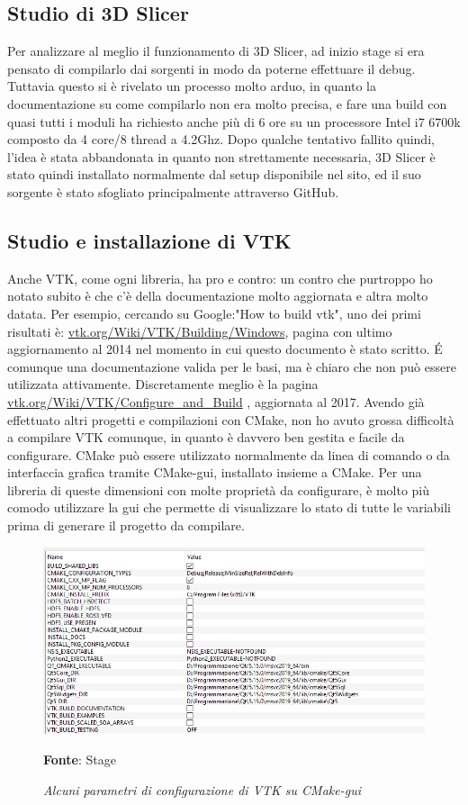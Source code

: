 \subsection{Studio di 3D Slicer}
Per analizzare al meglio il funzionamento di 3D Slicer, ad inizio stage si era pensato di compilarlo dai sorgenti in modo da poterne effettuare il debug. Tuttavia questo si è rivelato un processo molto arduo, in quanto la documentazione su come compilarlo non era molto precisa, e fare una build con quasi tutti i moduli ha richiesto anche più di 6 ore su un processore Intel i7 6700k composto da 4 core/8 thread a 4.2Ghz. Dopo qualche tentativo fallito quindi, l'idea è stata abbandonata in quanto non strettamente necessaria, 3D Slicer è stato quindi installato normalmente dal setup disponibile nel sito, ed il suo sorgente è stato sfogliato principalmente attraverso GitHub.

\subsection{Studio e installazione di VTK}
Anche VTK, come ogni libreria, ha pro e contro: un contro che purtroppo ho notato subito è che c'è della documentazione molto aggiornata e altra molto datata. Per esempio, cercando su Google:"How to build vtk", uno dei primi risultati è: \href{https://vtk.org/Wiki/VTK/Building/Windows}{vtk.org/Wiki/VTK/Building/Windows}, pagina con ultimo aggiornamento al 2014 nel momento in cui questo documento è stato scritto. \'E comunque una documentazione valida per le basi, ma è chiaro che non può essere utilizzata attivamente. Discretamente meglio è la pagina \href{https://vtk.org/Wiki/VTK/Configure_and_Build}{vtk.org/Wiki/VTK/Configure\_and\_Build} , aggiornata al 2017. Avendo già effettuato altri progetti e compilazioni con CMake, non ho avuto grossa difficoltà a compilare VTK comunque, in quanto è davvero ben gestita e facile da configurare. CMake può essere utilizzato normalmente da linea di comando o da interfaccia grafica tramite CMake-gui, installato insieme a CMake. Per una libreria di queste dimensioni con molte proprietà da configurare, è molto più comodo utilizzare la gui che permette di visualizzare lo stato di tutte le variabili prima di generare il progetto da compilare.

\begin{figure}[h]
    \centering
    \includegraphics[width=1\textwidth]{immagini/svolgimento/vtkcmake.png}
    \caption{\textit{Alcuni parametri di configurazione di VTK su CMake-gui}}
    \textbf{Fonte}: Stage
    \label{fig: VTK CMAKE}
\end{figure}

